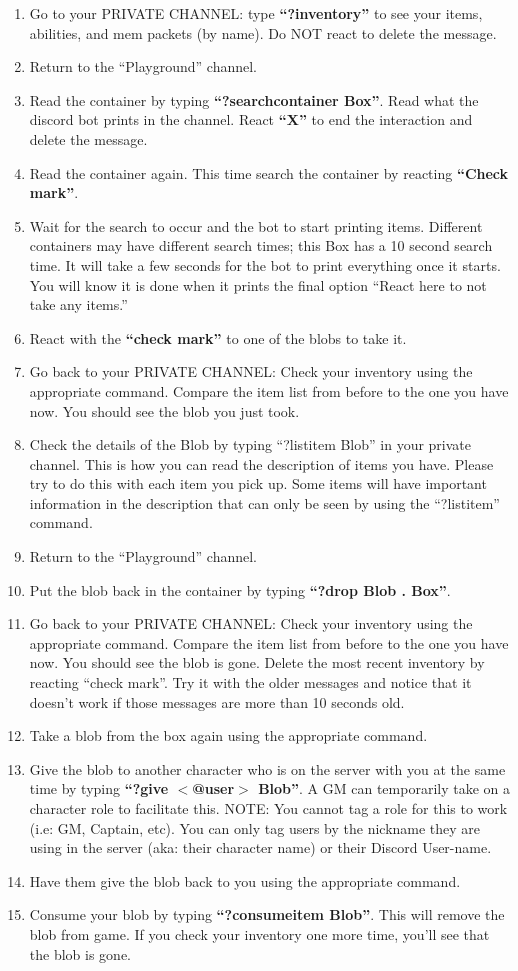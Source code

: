 \documentclass[green]{TMFHope}
\begin{document}
\begin{enumerate}
	\item Go to your PRIVATE CHANNEL: type \textbf{``?inventory''} to see your items, abilities, and mem packets (by name). Do NOT react to delete the message.
	\item Return to the ``Playground'' channel.
	\item Read the container by typing \textbf{``?searchcontainer Box''}. Read what the discord bot prints in the channel. React \textbf{``X''} to end the interaction and delete the message.
	\item Read the container again. This time search the container by reacting \textbf{``Check mark''}.
	\item Wait for the search to occur and the bot to start printing items. Different containers may have different search times; this Box has a 10 second search time. It will take a few seconds for the bot to print everything once it starts. You will know it is done when it prints the final option ``React here to not take any items.''
	\item React with the \textbf{``check mark''} to one of the blobs to take it.
	\item Go back to your PRIVATE CHANNEL: Check your inventory using the appropriate command. Compare the item list from before to the one you have now. You should see the blob you just took. 
	\item Check the details of the Blob by typing ``?listitem Blob'' in your private channel. This is how you can read the description of items you have. Please try to do this with each item you pick up. Some items will have important information in the description that can only be seen by using the ``?listitem'' command.
	\item Return to the ``Playground'' channel.
	\item Put the blob back in the container by typing \textbf{``?drop Blob . Box''}.
	\item Go back to your PRIVATE CHANNEL: Check your inventory using the appropriate command. Compare the item list from before to the one you have now. You should see the blob is gone. Delete the most recent inventory by reacting ``check mark''. Try it with the older messages and notice that it doesn't work if those messages are more than 10 seconds old.
	\item Take a blob from the box again using the appropriate command.
	\item Give the blob to another character who is on the server with you at the same time by typing \textbf{``?give $<$@user$>$ Blob''}. A GM can temporarily take on a character role to facilitate this. NOTE: You cannot tag a role for this to work (i.e: GM, Captain, etc). You can only tag users by the nickname they are using in the server (aka: their character name) or their Discord User-name.
	\item Have them give the blob back to you using the appropriate command.
	\item Consume your blob by typing \textbf{``?consumeitem Blob''}. This will remove the blob from game. If you check your inventory one more time, you'll see that the blob is gone.
\end{enumerate}
\end{document}
